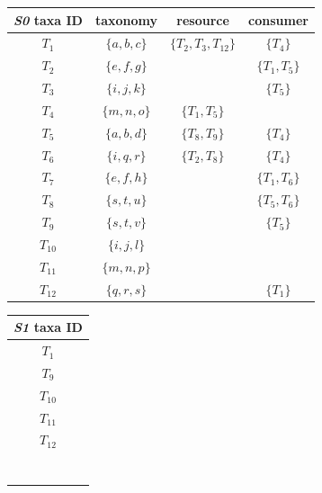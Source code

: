 \documentclass[letterpaper]{article}
\begin{document}
    \begin{table}
      \centering
      \begin{tabular}{cccc}
        \hline
        \textit{S0} taxa ID & taxonomy &          resource &             consumer        \\
        \hline
        \hline
        $T_1$ &         $\{a, b, c\}$ &     $\{T_2, T_3, T_{12}\}$ &    $\{T_4\}$         \\
        $T_2$ &         $\{e, f, g\}$ &      &                          $\{T_1, T_5\}$    \\
        $T_3$ &         $\{i, j, k\}$ &      &                          $\{T_5\}$         \\
        $T_4$ &         $\{m, n, o\}$ &     $\{T_1, T_5\}$ &                              \\
        $T_5$ &         $\{a, b, d\}$ &     $\{T_8, T_9\}$ &            $\{T_4\}$         \\
        $T_6$ &         $\{i, q, r\}$ &     $\{T_2, T_8\}$ &            $\{T_4\}$         \\
        $T_7$ &         $\{e, f, h\}$ &      &                          $\{T_1, T_6\}$    \\
        $T_8$ &         $\{s, t, u\}$ &      &                          $\{T_5, T_6\}$    \\
        $T_9$ &         $\{s, t, v\}$ &      &                          $\{T_5\}$         \\
        $T_{10}$ &      $\{i, j, l\}$ &      &                                            \\
        $T_{11}$ &      $\{m, n, p\}$ &      &                                            \\
        $T_{12}$ &      $\{q, r, s\}$ &      &                          $\{T_1\}$         \\
        \hline
      \end{tabular}
      \quad \quad
      \begin{tabular}{c}
          \hline
          \textit{S1} taxa ID \\
          \hline\hline
          $T_1$ \\
          $T_9$ \\
          $T_{10}$ \\
          $T_{11}$ \\
          $T_{12}$ \\
          \hline
          \\  \\  \\  \\  \\  \\  \\
      \end{tabular}
    \end{table}
\end{document}

